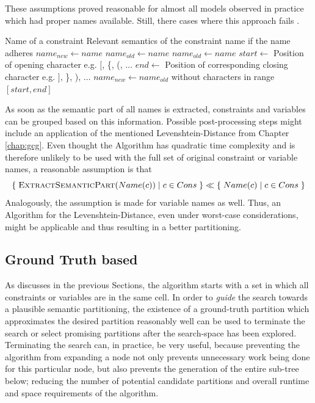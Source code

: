 			These assumptions proved reasonable for almost all models observed in practice which had proper names available. Still, there cases where this approach fails .

			\begin{algorithm}[ht!]
				\centering
				\begin{algorithmic}
					\Require Name of a constraint
					\Ensure Relevant semantics of the constraint name if the name adheres
					\Statex
						\State ${name}_{new} \gets name$
						\State ${name}_{old} \gets name$
						\Repeat
							\State ${name}_{old} \gets name$
							\State $start \gets$ Position of opening character e.g. $\lbrack$, \{, (, $\ldots$
							\State $end \gets$ Position of corresponding closing character e.g. $\rbrack$, \}, ), $\ldots$
							\State ${name}_{new} \gets {name}_{old}$ without characters in range $[start, end]$
					\EndFunction
				\end{algorithmic}
				\caption{}
				\label{algo:tree:scoring:nameheur}
			\end{algorithm}

			As soon as the semantic part of all names is extracted, constraints and variables can be grouped based on this information.
			Possible post-processing steps might include an application of the mentioned Levenshtein-Distance from Chapter \ref{chap:gcg}.
			Even thought the Algorithm has quadratic time complexity and is therefore unlikely to be used with the full set of original constraint or variable names, a reasonable assumption is that
			\begin{equation*}
				\{ \; \Call{ExtractSemanticPart}{Name(c)} \mid c \in Cons \; \} \ll \{ \; Name(c) \mid c \in Cons \; \}
			\end{equation*}
			Analogously, the assumption is made for variable names as well.
			Thus, an Algorithm for the Levenshtein-Distance, even under worst-case considerations, might be applicable and thus resulting in a better partitioning.

			\clearpage


		\subsection{Ground Truth based}
		\label{chap:tree:scoring:groundtruth}

			As discusses in the previous Sections, the algorithm starts with a set in which all constraints or variables are in the same cell.
			In order to \textit{guide} the search towards a plausible semantic partitioning, the existence of a ground-truth partition which approximates the desired partition reasonably well can be used to terminate the search or select promising partitions after the search-space has been explored.
			Terminating the search can, in practice, be very useful, because preventing the algorithm from expanding a node not only prevents unnecessary work being done for this particular node, but also prevents the generation of the entire sub-tree below; reducing the number of potential candidate partitions and overall runtime and space requirements of the algorithm.

